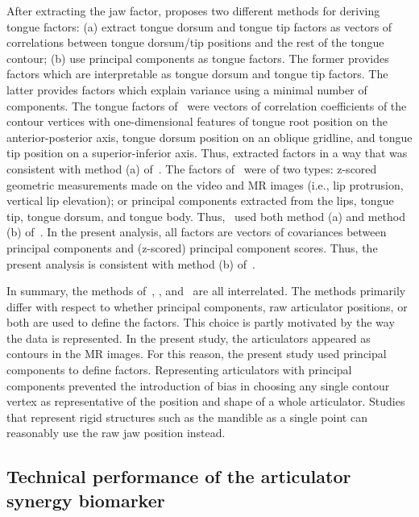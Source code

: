 \documentclass[reprint]{JASAnew}\usepackage[]{graphicx}\usepackage[]{color}
\begin{document}
After extracting the jaw factor, \citet{maeda1990compensatory} proposes two different methods for deriving tongue factors: (a) extract tongue dorsum and tongue tip factors as vectors of correlations between tongue dorsum/tip positions and the rest of the tongue contour; (b) use principal components as tongue factors. The former provides factors which are interpretable as tongue dorsum and tongue tip factors. The latter provides factors which explain variance using a minimal number of components. 
The tongue factors of~\citet{cai2009articulatory} were vectors of correlation coefficients of the contour vertices with one-dimensional features of tongue root position on the anterior-posterior axis, tongue dorsum position on an oblique gridline, and tongue tip position on a superior-inferior axis. Thus, \citet{cai2009articulatory} extracted factors in a way that was consistent with method (a) of~\citet{maeda1990compensatory}. The factors of~\citet{badin2006three} were of two types: z-scored geometric measurements made on the video and MR images (i.e., lip protrusion, vertical lip elevation); or principal components extracted from the lips, tongue tip, tongue dorsum, and tongue body. Thus,~\citet{badin2006three} used both method (a) and method (b) of~\citet{maeda1990compensatory}. In the present analysis, all factors are vectors of covariances between principal components and (z-scored) principal component scores. Thus, the present analysis is consistent with method (b) of~\citet{maeda1990compensatory}. 

In summary, the methods of~\citet{maeda1990compensatory}, \citet{cai2009articulatory}, and~\citet{badin2006three} are all interrelated. The methods primarily differ with respect to whether principal components, raw articulator positions, or both are used to define the factors. This choice is partly motivated by the way the data is represented. In the present study, the articulators appeared as contours in the MR images. For this reason, the present study used principal components to define factors. Representing articulators with principal components prevented the introduction of bias in choosing any single contour vertex as representative of the position and shape of a whole articulator. Studies that represent rigid structures such as the mandible as a single point can reasonably use the raw jaw position instead. 


\subsection{Technical performance of the articulator synergy biomarker}
\end{document}
